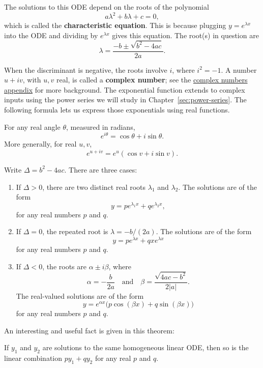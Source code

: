 The solutions to this ODE depend on the roots of the polynomial
$$a\lambda^2 + b\lambda + c = 0,$$
which is called the \textbf{characteristic equation}.
This is because plugging $y=e^{\lambda x}$ into the ODE and dividing by $e^{\lambda x}$ gives this equation.  The root(s) in question are
$$\lambda = \frac{-b \pm \sqrt{b^2-4ac}}{2a}.$$

When the discriminant is negative, the roots involve $i$, where
$i^2=-1$. A number $u+iv$, with $u,v$ real, is called a
\textbf{complex number}; see the
\hyperref[sec:complex-numbers]{complex numbers appendix} for more background.
The exponential function extends to complex inputs using the power
series we will study in Chapter~\ref{sec:power-series}. The following
formula lets us express those exponentials using real functions.

\begin{thm}
\label{thm:eulers-formula}
For any real angle $\theta$, measured in radians,
$$e^{i\theta}=\cos\theta+i\sin\theta.$$
More generally, for real $u,v$,
$$e^{u+iv}=e^u(\cos v+i\sin v).$$
\end{thm}

Write $\Delta=b^2-4ac$. There are three cases:
\begin{enumerate}
\item If $\Delta>0$, there are two distinct real roots $\lambda_1$ and $\lambda_2$. The solutions are of the form
$$y=pe^{\lambda_1 x} + qe^{\lambda_2 x},$$
for any real numbers $p$ and $q$.
\item If $\Delta=0$, the repeated root is $\lambda=-b/(2a)$. The solutions are of the form
$$y=pe^{\lambda x}+qxe^{\lambda x}$$
for any real numbers $p$ and $q$.
\item If $\Delta<0$, the roots are $\alpha\pm i\beta$, where
$$\alpha=-\frac{b}{2a}\quad\text{and}\quad \beta=\frac{\sqrt{4ac-b^2}}{2|a|}.$$
The real-valued solutions are of the form
$$y=e^{\alpha x}\bigl(p\cos(\beta x)+q\sin(\beta x)\bigr)$$
for any real numbers $p$ and $q$. 
\end{enumerate}

An interesting and useful fact is given in this theorem:
\begin{thm}
If $y_1$ and $y_2$ are solutions to the same homogeneous linear ODE, then so is the linear combination $p{y_1}+q{y_2}$ for any real $p$ and $q$.
\end{thm}
 
